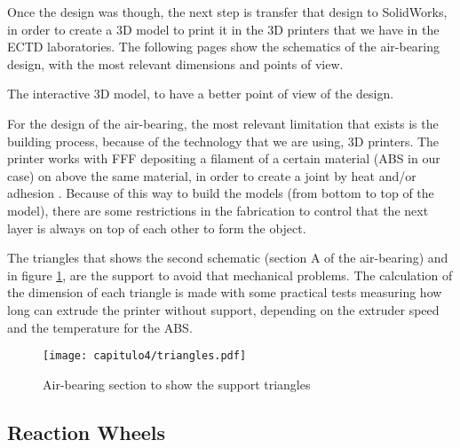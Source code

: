 Once the design was though, the next step is transfer that design to SolidWorks, in order to create a 3D model to print it in the 3D printers that we have in the \acrshort{ECTD} laboratories. The following pages show the schematics of the air-bearing design, with the most relevant dimensions and points of view.






The interactive 3D model, to have a better point of view of the design.


For the design of the air-bearing, the most relevant limitation that exists is the building process, because of the technology that we are using, 3D printers. The printer works with \acrshort{FFF} depositing a filament of a certain material (\acrshort{ABS} in our case) on above the same material, in order to create a joint by heat and/or adhesion \cite{FFF}. Because of this way to build the models (from bottom to top of the model), there are some restrictions in the fabrication to control that the next layer is always on top of each other to form the object.

The triangles that shows the second schematic (section A of the air-bearing) and in figure \ref{fig:triangles}, are the support to avoid that mechanical problems. The calculation of the dimension of each triangle is made with some practical tests measuring how long can extrude the printer without support, depending on the extruder speed and the temperature for the \acrshort{ABS}. 


\begin{figure}[H]
	\centering
		\texttt{[image: capitulo4/triangles.pdf]}
	\caption{Air-bearing section to show the support triangles}
	\label{fig:triangles}
\end{figure}

\subsection{Reaction Wheels} \label{ssec:reactionwheels}

